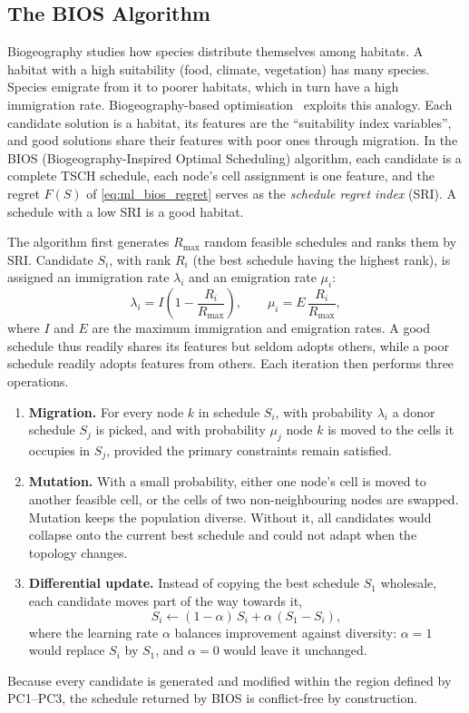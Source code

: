 \subsection{The BIOS Algorithm}
Biogeography studies how species distribute themselves among habitats. A habitat with a high suitability (food, climate, vegetation) has many species. Species emigrate from it to poorer habitats, which in turn have a high immigration rate. Biogeography-based optimisation~\cite{ml_simon2008bbo} exploits this analogy. Each candidate solution is a habitat, its features are the ``suitability index variables'', and good solutions share their features with poor ones through migration. In the BIOS (Biogeography-Inspired Optimal Scheduling) algorithm, each candidate is a complete TSCH schedule, each node's cell assignment is one feature, and the regret $F(S)$ of \eqref{eq:ml_bios_regret} serves as the \emph{schedule regret index} (SRI). A schedule with a low SRI is a good habitat.

The algorithm first generates $R_{\max}$ random feasible schedules and ranks them by SRI. Candidate $S_i$, with rank $R_i$ (the best schedule having the highest rank), is assigned an immigration rate $\lambda_i$ and an emigration rate $\mu_i$:
\begin{equation}
  \lambda_i=I\left(1-\frac{R_i}{R_{\max}}\right), \qquad
  \mu_i=E\,\frac{R_i}{R_{\max}},
  \label{eq:ml_bios_migration}
\end{equation}
where $I$ and $E$ are the maximum immigration and emigration rates. A good schedule thus readily shares its features but seldom adopts others, while a poor schedule readily adopts features from others. Each iteration then performs three operations.
\begin{enumerate}
  \item \textbf{Migration.} For every node $k$ in schedule $S_i$, with probability $\lambda_i$ a donor schedule $S_j$ is picked, and with probability $\mu_j$ node $k$ is moved to the cells it occupies in $S_j$, provided the primary constraints remain satisfied.
  \item \textbf{Mutation.} With a small probability, either one node's cell is moved to another feasible cell, or the cells of two non-neighbouring nodes are swapped. Mutation keeps the population diverse. Without it, all candidates would collapse onto the current best schedule and could not adapt when the topology changes.
  \item \textbf{Differential update.} Instead of copying the best schedule $S_1$ wholesale, each candidate moves part of the way towards it,
  \begin{equation}
    S_i \leftarrow (1-\alpha)\,S_i+\alpha\,(S_1-S_i),
  \end{equation}
  where the learning rate $\alpha$ balances improvement against diversity: $\alpha=1$ would replace $S_i$ by $S_1$, and $\alpha=0$ would leave it unchanged.
\end{enumerate}
Because every candidate is generated and modified within the region defined by PC1--PC3, the schedule returned by BIOS is conflict-free by construction.

